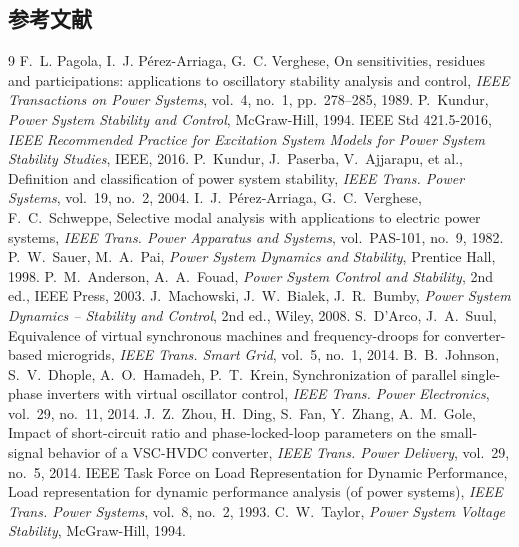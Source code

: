 \subsection{参考文献}
{\renewcommand{\section}[2]{}%
\begin{thebibliography}{9}\small
{} F.~L. Pagola, I.~J. P\'erez-Arriaga, G.~C. Verghese, On
sensitivities, residues and participations: applications to oscillatory
stability analysis and control, \emph{IEEE Transactions on Power Systems},
vol.~4, no.~1, pp.~278--285, 1989.
 P.~Kundur, \emph{Power System Stability and Control},
McGraw-Hill, 1994.
 IEEE Std 421.5-2016, \emph{IEEE Recommended Practice for
Excitation System Models for Power System Stability Studies}, IEEE, 2016.
 P.~Kundur, J.~Paserba, V.~Ajjarapu, et al., Definition and
classification of power system stability, \emph{IEEE Trans. Power Systems},
vol.~19, no.~2, 2004.
 I.~J.~P\'erez-Arriaga, G.~C.~Verghese,
F.~C.~Schweppe, Selective modal analysis with applications to electric power
systems, \emph{IEEE Trans. Power Apparatus and Systems}, vol.~PAS-101, no.~9,
1982.
 P.~W.~Sauer, M.~A.~Pai, \emph{Power System Dynamics and
Stability}, Prentice Hall, 1998.
 P.~M.~Anderson, A.~A.~Fouad, \emph{Power System
Control and Stability}, 2nd ed., IEEE Press, 2003.
 J.~Machowski, J.~W.~Bialek, J.~R.~Bumby,
\emph{Power System Dynamics -- Stability and Control}, 2nd ed., Wiley, 2008.
 S.~D'Arco, J.~A.~Suul, Equivalence of virtual synchronous
machines and frequency-droops for converter-based microgrids,
\emph{IEEE Trans. Smart Grid}, vol.~5, no.~1, 2014.
 B.~B.~Johnson, S.~V.~Dhople, A.~O.~Hamadeh,
P.~T.~Krein, Synchronization of parallel single-phase inverters with virtual
oscillator control, \emph{IEEE Trans. Power Electronics}, vol.~29, no.~11, 2014.
 J.~Z.~Zhou, H.~Ding, S.~Fan, Y.~Zhang, A.~M.~Gole,
Impact of short-circuit ratio and phase-locked-loop parameters on the
small-signal behavior of a VSC-HVDC converter, \emph{IEEE Trans. Power
Delivery}, vol.~29, no.~5, 2014.
 IEEE Task Force on Load Representation for Dynamic
Performance, Load representation for dynamic performance analysis (of power
systems), \emph{IEEE Trans. Power Systems}, vol.~8, no.~2, 1993.
 C.~W.~Taylor, \emph{Power System Voltage Stability},
McGraw-Hill, 1994.
\end{thebibliography}}
